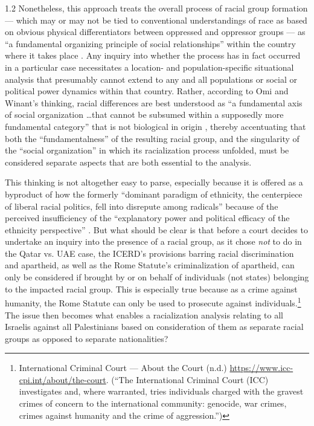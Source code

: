 \documentclass[../unravbook.tex]{subfiles}
\begin{document}
\begin{spacing}{1.2}
Nonetheless, this approach treats the overall process of racial group formation --- which may or may not be tied to conventional understandings of race as based on obvious physical differentiators between oppressed and oppressor groups ---  as \enquote{a fundamental organizing principle of social relationships} within the country where it takes place \parencite[66]{Omi-Winant-1994}. Any inquiry into whether the process has in fact occurred in a particular case necessitates a location- and population-specific situational analysis that presumably cannot extend to any and all populations or social or political power dynamics within that country. Rather, according to Omi and Winant's thinking, racial differences are best understood as ``a fundamental axis of social organization \ldots that cannot be subsumed within a supposedly more fundamental category'' that is not biological in origin \parencite[13]{Omi-Winant-1994}, thereby accentuating that both the \enquote{fundamentalness} of the resulting racial group, and the singularity of the ``social organization'' in which its racialization process unfolded, must be considered separate aspects that are both essential to the analysis. 

This thinking is not altogether easy to parse, especially because it is offered as a byproduct of how the formerly \enquote{dominant paradigm of ethnicity, the centerpiece of liberal racial politics, fell into disrepute among radicals} because of the perceived insufficiency of the \enquote{explanatory power and political efficacy of the ethnicity perspective} \parencite[139]{Omi-Winant-1994}. But what should be clear is that before a court decides to undertake an inquiry into the presence of a racial group, as it chose \textit{not} to do in the Qatar vs. UAE case,  the ICERD's provisions barring racial discrimination and apartheid, as well as the Rome Statute's criminalization of apartheid, can only be considered if brought by or on behalf of individuals (not states) belonging to the impacted racial group. This is especially true because as a crime against humanity, the Rome Statute can only be used to prosecute against individuals.\footnote{International Criminal Court --- About the Court (n.d.) \url{https://www.icc-cpi.int/about/the-court}. (\enquote{The International Criminal Court (ICC) investigates and, where warranted, tries individuals charged with the gravest crimes of concern to the international community: genocide, war crimes, crimes against humanity and the crime of aggression.})} The issue then becomes what enables a racialization analysis relating to all Israelis against all Palestinians based on consideration of them as separate racial groups as opposed to separate nationalities? 


\end{spacing}
\end{document}
